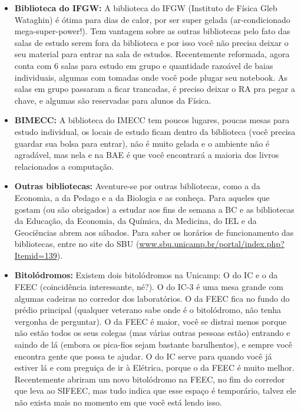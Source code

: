 \begin{itemize}
      \item \textbf{Biblioteca do IFGW:} A biblioteca do IFGW (Instituto de
        Física Gleb Wataghin) é ótima para dias de calor, por ser super gelada
        (ar-condicionado mega-super-power!). Tem vantagem sobre as outras
        bibliotecas pelo fato das salas de estudo serem fora da biblioteca e por
        isso você não precisa deixar o seu material para entrar na sala de
        estudos. Recentemente reformada, agora conta com 6 salas para estudo em
        grupo e quantidade razoável de baias individuais, algumas com tomadas
        onde você pode plugar seu notebook. As salas em grupo passaram a ficar
        trancadas, é preciso deixar o RA pra pegar a chave, e algumas são
        reservadas para alunos da Física.

    \item  \textbf{BIMECC:} A biblioteca do IMECC tem poucos lugares, poucas
        mesas para estudo individual, os locais de estudo ficam dentro da
        biblioteca (você precisa guardar sua bolsa para entrar), não é muito
        gelada e o ambiente não é agradável, mas nela e na BAE é que você
        encontrará a maioria dos livros relacionados a computação.

    \item  \textbf{Outras bibliotecas:} Aventure-se por outras bibliotecas, como
        a da Economia, a da Pedago e a da Biologia e as conheça. Para aqueles
        que gostam (ou são obrigados) a estudar aos fins de semana a BC e as
        bibliotecas da Educação, da Economia, da Química, da Medicina, do IEL e
        da Geociências abrem aos sábados. Para saber os horários de
        funcionamento das bibliotecas, entre no site do SBU
        (\url{www.sbu.unicamp.br/portal/index.php?Itemid=139}).

    \item  \textbf{Bitolódromos:} Existem dois bitolódromos na Unicamp: O do IC
        e o da FEEC (coincidência interessante, né?). O do IC-3 é uma mesa
        grande com algumas cadeiras no corredor dos laboratórios. O da FEEC fica
        no fundo do prédio principal (qualquer veterano sabe onde é o
        bitolódromo, não tenha vergonha de perguntar). O da FEEC é maior, você
        se distrai menos porque não estão todos os seus colegas (mas várias
        outras pessoas estão) entrando e saindo de lá (embora os pica-fios sejam
        bastante barulhentos), e sempre você encontra gente que possa te ajudar.
        O do IC serve para quando você já estiver lá e com preguiça de ir à
        Elétrica, porque o da FEEC é muito melhor. Recentemente abriram um novo
        bitolódromo na FEEC, no fim do corredor que leva ao SIFEEC, mas tudo
        indica que esse espaço é temporário, talvez ele não exista mais no
        momento em que você está lendo isso.


\end{itemize}
